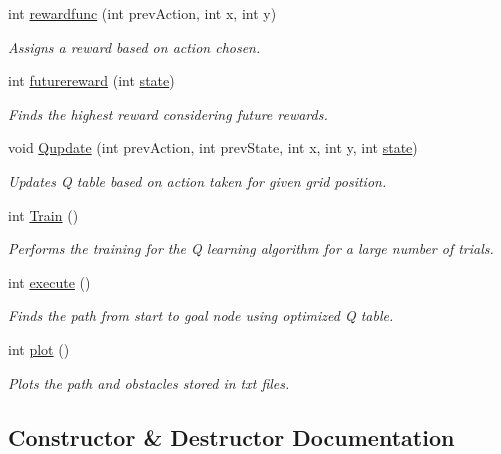 \begin{DoxyCompactItemize}
int \hyperlink{classQclass_a4155dabacd6e918c6288bd453e956547}{rewardfunc} (int prev\+Action, int x, int y)
\begin{DoxyCompactList}\small\item\em Assigns a reward based on action chosen. \end{DoxyCompactList}\item 
int \hyperlink{classQclass_acf95c3d28bc5ab0409a0824abf36fe04}{futurereward} (int \hyperlink{classQclass_ac7e42ac35f89616a6036aabd29e928f7}{state})
\begin{DoxyCompactList}\small\item\em Finds the highest reward considering future rewards. \end{DoxyCompactList}\item 
void \hyperlink{classQclass_a9feff64b8b2c661a16f4229215957541}{Qupdate} (int prev\+Action, int prev\+State, int x, int y, int \hyperlink{classQclass_ac7e42ac35f89616a6036aabd29e928f7}{state})
\begin{DoxyCompactList}\small\item\em Updates Q table based on action taken for given grid position. \end{DoxyCompactList}\item 
int \hyperlink{classQclass_a4bf8b5d57ca3cf93ee0b9e74c5eeb5f8}{Train} ()
\begin{DoxyCompactList}\small\item\em Performs the training for the Q learning algorithm for a large number of trials. \end{DoxyCompactList}\item 
int \hyperlink{classQclass_a475913f6b4aa9508a501007260afe96b}{execute} ()
\begin{DoxyCompactList}\small\item\em Finds the path from start to goal node using optimized Q table. \end{DoxyCompactList}\item 
int \hyperlink{classQclass_aecebf934f5a3500e2bf2ae98ca02093c}{plot} ()
\begin{DoxyCompactList}\small\item\em Plots the path and obstacles stored in txt files. \end{DoxyCompactList}\end{DoxyCompactItemize}


\subsection{Constructor \& Destructor Documentation}
